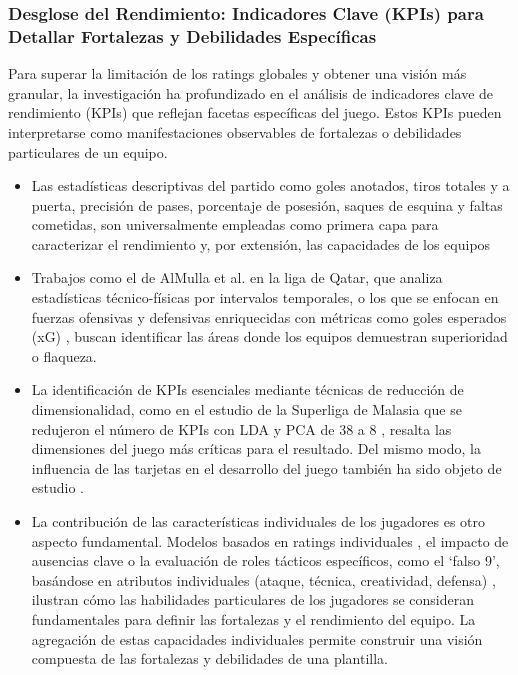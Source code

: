 \subsubsection{Desglose del Rendimiento: Indicadores Clave (KPIs) para Detallar Fortalezas y Debilidades Específicas}

Para superar la limitación de los ratings globales y obtener una visión más granular, la investigación ha profundizado en el análisis de indicadores clave de rendimiento (KPIs) que reflejan facetas específicas del juego. Estos KPIs pueden interpretarse como manifestaciones observables de fortalezas o debilidades particulares de un equipo.

\begin{itemize}
    \item Las estadísticas descriptivas del partido como goles anotados, tiros totales y a puerta, precisión de pases, porcentaje de posesión, saques de esquina y faltas cometidas, son universalmente empleadas como primera capa para caracterizar el rendimiento y, por extensión, las capacidades de los equipos \cite{mPredictingOutcomeFuture2023, liPassingWinUsing2021, koningBettingMarketEfficiency2023}
    \item Trabajos como el de AlMulla et al. \cite{almullaSoccerNetGatedRecurrent2023} en la liga de Qatar, que analiza estadísticas técnico-físicas por intervalos temporales, o los que se enfocan en fuerzas ofensivas y defensivas enriquecidas con métricas como goles esperados (xG) \cite{koopmanForecastingFootballMatch2019,alvarezDataScienceApproach2024,wheatcroftForecastingFootballMatches2021}, buscan identificar las áreas donde los equipos demuestran superioridad o flaqueza.
    \item La identificación de KPIs esenciales mediante técnicas de reducción de dimensionalidad, como en el estudio de la Superliga de Malasia que se redujeron el número de KPIs con LDA y PCA de 38 a 8 \cite{abdulrahimDeterminationEssentialPerformance2023}, resalta las dimensiones del juego más críticas para el resultado. Del mismo modo, la influencia de las tarjetas en el desarrollo del juego también ha sido objeto de estudio \cite{badiellaInfluenceRedYellow2023}.
    \item La contribución de las características individuales de los jugadores es otro aspecto fundamental. Modelos basados en ratings individuales \cite{holmesForecastingFootballMatch2024, yeungFrameworkInterpretableMatch2023}, el impacto de ausencias clave \cite{zhangModelingPredictingOutcomes2021} o la evaluación de roles tácticos específicos, como el `falso 9', basándose en atributos individuales (ataque, técnica, creatividad, defensa) \cite{oluwayomiEvaluationTeamsFalse2022}, ilustran cómo las habilidades particulares de los jugadores se consideran fundamentales para definir las fortalezas y el rendimiento del equipo. La agregación de estas capacidades individuales permite construir una visión compuesta de las fortalezas y debilidades de una plantilla.
\end{itemize}

